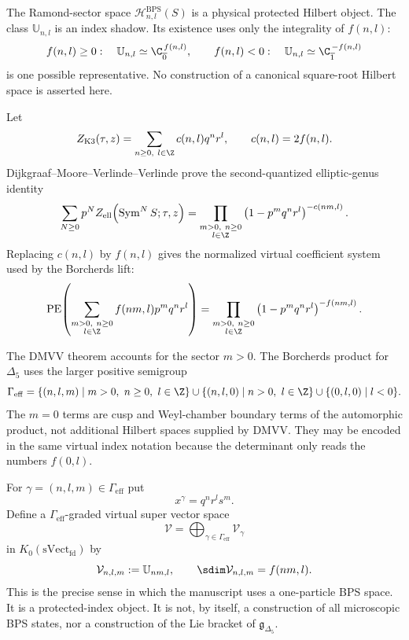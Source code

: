 \begin{remark}
The Ramond-sector space
$\mathcal H^{\mathrm{BPS}}_{n,l}(S)$ is a physical protected Hilbert
object.  The class $\mathbb U_{n,l}$ is an index shadow.  Its existence
uses only the integrality of $f(n,l)$:
$$
f(n,l)\geq0:\quad \mathbb U_{n,l}\simeq\C_{\overline0}^{\,f(n,l)},
\qquad
f(n,l)<0:\quad \mathbb U_{n,l}\simeq\C_{\overline1}^{\,-f(n,l)}
$$
is one possible representative.  No construction of a canonical
square-root Hilbert space is asserted here.
\end{remark}

\begin{theorem}
Let
$$
Z_{\mathrm{K3}}(\tau,z)=\sum_{n\geq0,\ l\in\Z}c(n,l)q^nr^l,
\qquad c(n,l)=2f(n,l).
$$
Dijkgraaf--Moore--Verlinde--Verlinde \cite{DMVV} prove the
second-quantized elliptic-genus identity
$$
\sum_{N\geq0}p^N Z_{\mathrm{ell}}\!\left(\operatorname{Sym}^N S;\tau,z\right)
=
\prod_{\substack{m>0,\ n\geq0\\ l\in\Z}}
\left(1-p^m q^n r^l\right)^{-c(nm,l)}.
$$
Replacing $c(n,l)$ by $f(n,l)$ gives the normalized virtual coefficient
system used by the Borcherds lift:
$$
\operatorname{PE}\!\left(\sum_{\substack{m>0,\ n\geq0\\ l\in\Z}}
f(nm,l)p^mq^nr^l\right)
=
\prod_{\substack{m>0,\ n\geq0\\ l\in\Z}}
\left(1-p^m q^n r^l\right)^{-f(nm,l)}.
$$
\end{theorem}

\begin{remark}
The DMVV theorem accounts for the sector $m>0$.  The Borcherds product
for $\Delta_5$ uses the larger positive semigroup
$$
\Gamma_{\mathrm{eff}}=
\{(n,l,m)\mid m>0,\ n\geq0,\ l\in\Z\}
\cup
\{(n,l,0)\mid n>0,\ l\in\Z\}
\cup
\{(0,l,0)\mid l<0\}.
$$
The $m=0$ terms are cusp and Weyl-chamber boundary terms of the
automorphic product, not additional Hilbert spaces supplied by DMVV.
They may be encoded in the same virtual index notation because the
determinant only reads the numbers $f(0,l)$.
\end{remark}

\begin{definition}
For $\gamma=(n,l,m)\in\Gamma_{\mathrm{eff}}$ put
$$x^\gamma=q^nr^ls^m.$$
Define a $\Gamma_{\mathrm{eff}}$-graded virtual super vector space
$$
\mathcal V=\bigoplus_{\gamma\in\Gamma_{\mathrm{eff}}}\mathcal V_\gamma
$$
in $K_0(\mathrm{sVect}_{\mathrm{fd}})$ by
$$
\mathcal V_{n,l,m}:=\mathbb U_{nm,l},\qquad
\sdim\mathcal V_{n,l,m}=f(nm,l).
$$
This is the precise sense in which the manuscript uses a one-particle
BPS space.  It is a protected-index object.  It is not, by itself, a
construction of all microscopic BPS states, nor a construction of the
Lie bracket of $\mathfrak g_{\Delta_5}$.
\end{definition}

